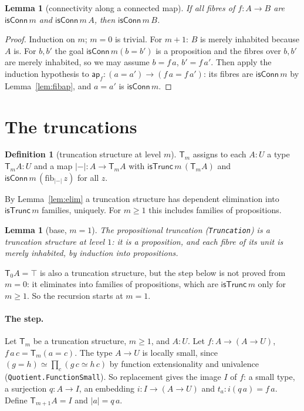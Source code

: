 \documentclass[11pt]{amsart}
\newtheorem{lemma}[theorem]{Lemma}
\theoremstyle{definition}
\newtheorem{definition}[theorem]{Definition}
\theoremstyle{remark}
\newcommand{\fib}{\mathrm{fib}}
\newcommand{\Tr}[1]{\mathsf{T}_{#1}}
\newcommand{\un}[1]{|#1|}
\newcommand{\code}[1]{\texttt{#1}}
\newcommand{\cT}{\mathsf{isTrunc}}
\newcommand{\cC}{\mathsf{isConn}}
\begin{document}
\begin{lemma}[connectivity along a connected map]\label{lem:connup}
If all fibres of $f:A\to B$ are $\cC\,m$ and $\cC\,m\,A$, then $\cC\,m\,B$.
\end{lemma}
\begin{proof}
Induction on $m$; $m=0$ is trivial. For $m+1$: $B$ is merely inhabited
because $A$ is. For $b,b'$ the goal $\cC\,m(b=b')$ is a proposition and
the fibres over $b,b'$ are merely inhabited, so we may assume $b=f\,a$,
$b'=f\,a'$. Then apply the induction hypothesis to
$\mathsf{ap}_f:(a=a')\to(f\,a=f\,a')$: its fibres are $\cC\,m$ by
Lemma~\ref{lem:fibap}, and $a=a'$ is $\cC\,m$.
\end{proof}

\section{The truncations}

\begin{definition}[truncation structure at level $m$]
$\Tr m$ assigns to each $A:U$ a type $\Tr mA:U$ and a map
$\un-:A\to\Tr mA$ with $\cT\,m\,(\Tr mA)$ and $\cC\,m\,(\fib_{\un-}\,z)$
for all $z$.
\end{definition}

By Lemma~\ref{lem:elim} a truncation structure has dependent elimination
into $\cT\,m$ families, uniquely. For $m\ge1$ this includes families of
propositions.

\begin{lemma}[base, $m=1$]\label{lem:base}
The propositional truncation (\code{Truncation}) is a truncation
structure at level $1$: it is a proposition, and each fibre of its unit
is merely inhabited, by induction into propositions.
\end{lemma}

$\Tr0A=\top$ is also a truncation structure, but the step below is not
proved from $m=0$: it eliminates into families of propositions, which
are $\cT\,m$ only for $m\ge1$. So the recursion starts at $m=1$.

\paragraph{The step.} Let $\Tr m$ be a truncation structure, $m\ge1$, and $A:U$.
Let $f:A\to(A\to U)$, $f\,a\,c=\Tr m(a=c)$. The type $A\to U$ is
locally small, since $(g=h)\simeq\prod_c(g\,c\simeq h\,c)$ by function
extensionality and univalence (\code{Quotient.FunctionSmall}). So
replacement gives the image $I$ of $f$: a small type, a surjection
$q:A\to I$, an embedding $i:I\to(A\to U)$ and $t_a:i(q\,a)=f\,a$. Define
$\Tr{m+1}A=I$ and $\un a=q\,a$.
\end{document}
